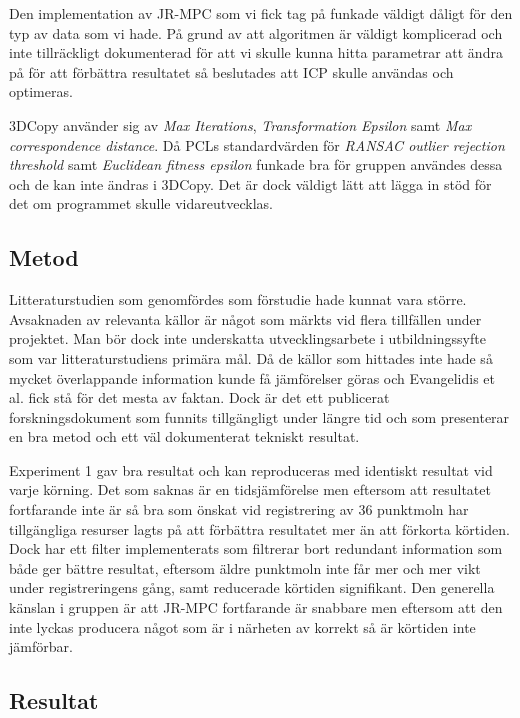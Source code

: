 Den implementation av JR-MPC som vi fick tag på funkade väldigt dåligt för den typ av data som vi hade. På grund av att algoritmen är väldigt komplicerad och inte tillräckligt dokumenterad för att vi skulle kunna hitta parametrar att ändra på för att förbättra resultatet så beslutades att ICP skulle användas och optimeras.

3DCopy använder sig av \textit{Max Iterations}, \textit{Transformation Epsilon} samt \textit{Max correspondence distance}. Då PCLs standardvärden för \textit{RANSAC outlier rejection threshold} samt \textit{Euclidean fitness epsilon} funkade bra för gruppen användes dessa och de kan inte ändras i 3DCopy. Det är dock väldigt lätt att lägga in stöd för det om programmet skulle vidareutvecklas.

\subsection{Metod}

Litteraturstudien som genomfördes som förstudie hade kunnat vara större. Avsaknaden av relevanta källor är något som märkts vid flera tillfällen under projektet. Man bör dock inte underskatta utvecklingsarbete i utbildningssyfte som var litteraturstudiens primära mål. Då de källor som hittades inte hade så mycket överlappande information kunde få jämförelser göras och Evangelidis et al. \cite{Evangelidis-ECCV-2014} fick stå för det mesta av faktan. Dock är det ett publicerat forskningsdokument som funnits tillgängligt under längre tid och som presenterar en bra metod och ett väl dokumenterat tekniskt resultat.

Experiment 1 gav bra resultat och kan reproduceras med identiskt resultat vid varje körning. Det som saknas är en tidsjämförelse men eftersom att resultatet fortfarande inte är så bra som önskat vid registrering av 36 punktmoln har tillgängliga resurser lagts på att förbättra resultatet mer än att förkorta körtiden. Dock har ett filter implementerats som filtrerar bort redundant information som både ger bättre resultat, eftersom äldre punktmoln inte får mer och mer vikt under registreringens gång, samt reducerade körtiden signifikant. Den generella känslan i gruppen är att JR-MPC fortfarande är snabbare men eftersom att den inte lyckas producera något som är i närheten av korrekt så är körtiden inte jämförbar. 

\subsection{Resultat}


